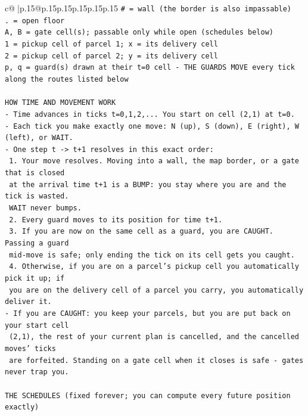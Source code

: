 \documentclass{article}
\begin{document}
{\begin{supertabular}{c@{$\;$}|p{.15\linewidth}@{}p{.15\linewidth}p{.15\linewidth}p{.15\linewidth}p{.15\linewidth}p{.15\linewidth}}
{{{\texttt{\# = wall (the border is also impassable)} \\
\texttt{. = open floor} \\
\texttt{A, B = gate cell(s); passable only while open (schedules below)} \\
\texttt{1 = pickup cell of parcel 1; x = its delivery cell} \\
\texttt{2 = pickup cell of parcel 2; y = its delivery cell} \\
\texttt{p, q = guard(s) drawn at their t=0 cell {-} THE GUARDS MOVE every tick along the routes listed below} \\
\\ 
\texttt{HOW TIME AND MOVEMENT WORK} \\
\texttt{{-} Time advances in ticks t=0,1,2,... You start on cell (2,1) at t=0.} \\
\texttt{{-} Each tick you make exactly one move: N (up), S (down), E (right), W (left), or WAIT.} \\
\texttt{{-} One step t {-}> t+1 resolves in this exact order:} \\
\texttt{  1. Your move resolves. Moving into a wall, the map border, or a gate that is closed} \\
\texttt{     at the arrival time t+1 is a BUMP: you stay where you are and the tick is wasted.} \\
\texttt{     WAIT never bumps.} \\
\texttt{  2. Every guard moves to its position for time t+1.} \\
\texttt{  3. If you are now on the same cell as a guard, you are CAUGHT. Passing a guard} \\
\texttt{     mid{-}move is safe; only ending the tick on its cell gets you caught.} \\
\texttt{  4. Otherwise, if you are on a parcel's pickup cell you automatically pick it up; if} \\
\texttt{     you are on the delivery cell of a parcel you carry, you automatically deliver it.} \\
\texttt{{-} If you are CAUGHT: you keep your parcels, but you are put back on your start cell} \\
\texttt{  (2,1), the rest of your current plan is cancelled, and the cancelled moves' ticks} \\
\texttt{  are forfeited. Standing on a gate cell when it closes is safe {-} gates never trap you.} \\
\\ 
\texttt{THE SCHEDULES (fixed forever; you can compute every future position exactly)} \\
}}}
\end{supertabular}}
\end{document}
